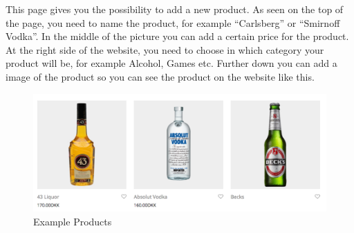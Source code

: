 \documentclass[12p]{article}
\begin{document}
This page gives you the possibility to add a new product. As seen on the top of the page, you need to name the product, for example “Carlsberg” or “Smirnoff Vodka”. In the middle of the picture you can add a certain price for the product. At the right side of the website, you need to choose in which category your product will be, for example Alcohol, Games etc. Further down you can add a image of the product so you can see the product on the website like this.
\\
\begin{figure}[ht]
    \centering
    \includegraphics[width=1\textwidth]{4.png}
    \caption{Example Products}
    \label{fig:wordpress_example_products}
\end{figure}


\newpage
\end{document}
